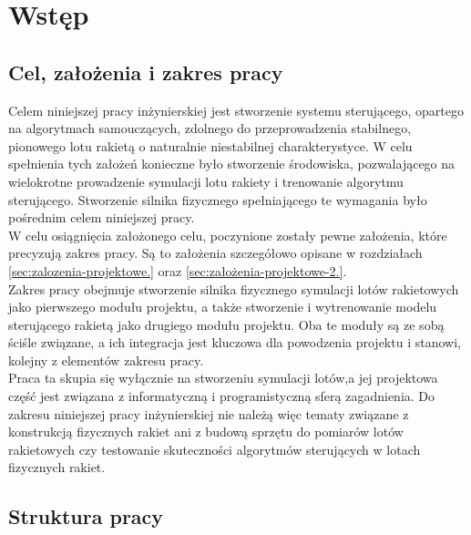 \chapter{Wstęp}

\section{Cel, założenia i zakres pracy}
Celem niniejszej pracy inżynierskiej jest stworzenie systemu sterującego,
opartego na algorytmach samouczących, zdolnego do przeprowadzenia
stabilnego, pionowego lotu rakietą o naturalnie niestabilnej charakterystyce.
W celu spełnienia tych założeń konieczne było stworzenie środowiska,
pozwalającego na wielokrotne prowadzenie symulacji lotu rakiety i trenowanie
algorytmu sterującego.
Stworzenie silnika fizycznego spełniającego te wymagania było pośrednim celem
niniejszej pracy.\\
W celu osiągnięcia założonego celu, poczynione zostały pewne założenia,
które precyzują zakres pracy. Są to założenia szczegółowo opisane w
rozdziałach \ref{sec:zalozenia-projektowe.} oraz
\ref{sec:założenia-projektowe-2.}.\\
Zakres pracy obejmuje stworzenie silnika fizycznego symulacji lotów
rakietowych jako pierwszego modułu projektu, a także stworzenie i
wytrenowanie modelu sterującego rakietą jako drugiego modułu projektu. Oba
te moduły są ze sobą ściśle związane, a ich integracja jest kluczowa dla
powodzenia projektu i stanowi, kolejny z elementów zakresu pracy.\\
Praca ta skupia się wyłącznie na stworzeniu symulacji
lotów,a  jej
projektowa część jest związana z informatyczną i programistyczną
sferą zagadnienia.
Do zakresu niniejszej pracy inżynierskiej nie należą więc tematy
związane z konstrukcją fizycznych rakiet ani z budową sprzętu do pomiarów
lotów rakietowych czy testowanie skuteczności algorytmów sterujących w lotach
fizycznych rakiet.
\section{Struktura pracy}

